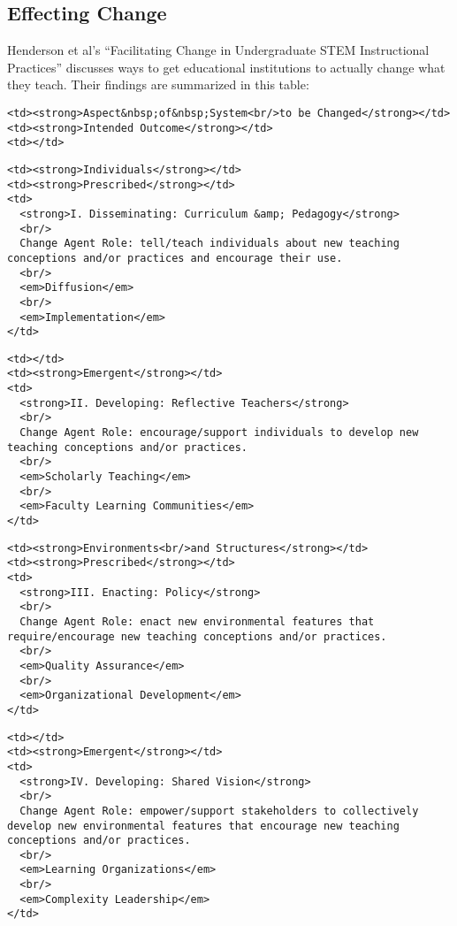 \subsection{Effecting Change}\label{effecting-change}

Henderson et al's
``Facilitating Change in Undergraduate STEM Instructional Practices''
\cite{bib:henderson-facilitating}
discusses ways
to get educational institutions to actually change what they teach.
Their findings are summarized in this table:

\begin{verbatim}
<td><strong>Aspect&nbsp;of&nbsp;System<br/>to be Changed</strong></td>
<td><strong>Intended Outcome</strong></td>
<td></td>
\end{verbatim}

\begin{verbatim}
<td><strong>Individuals</strong></td>
<td><strong>Prescribed</strong></td>
<td>
  <strong>I. Disseminating: Curriculum &amp; Pedagogy</strong>
  <br/>
  Change Agent Role: tell/teach individuals about new teaching conceptions and/or practices and encourage their use.
  <br/>
  <em>Diffusion</em>
  <br/>
  <em>Implementation</em>
</td>
\end{verbatim}

\begin{verbatim}
<td></td>
<td><strong>Emergent</strong></td>
<td>
  <strong>II. Developing: Reflective Teachers</strong>
  <br/>
  Change Agent Role: encourage/support individuals to develop new teaching conceptions and/or practices.
  <br/>
  <em>Scholarly Teaching</em>
  <br/>
  <em>Faculty Learning Communities</em>
</td>
\end{verbatim}

\begin{verbatim}
<td><strong>Environments<br/>and Structures</strong></td>
<td><strong>Prescribed</strong></td>
<td>
  <strong>III. Enacting: Policy</strong>
  <br/>
  Change Agent Role: enact new environmental features that require/encourage new teaching conceptions and/or practices.
  <br/>
  <em>Quality Assurance</em>
  <br/>
  <em>Organizational Development</em>
</td>
\end{verbatim}

\begin{verbatim}
<td></td>
<td><strong>Emergent</strong></td>
<td>
  <strong>IV. Developing: Shared Vision</strong>
  <br/>
  Change Agent Role: empower/support stakeholders to collectively develop new environmental features that encourage new teaching conceptions and/or practices.
  <br/>
  <em>Learning Organizations</em>
  <br/>
  <em>Complexity Leadership</em>
</td>
\end{verbatim}

